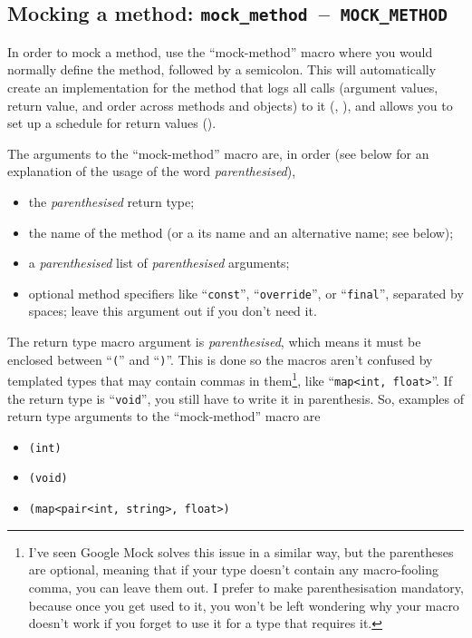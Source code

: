 \documentclass[twoside, a4paper, article]{memoir}
\newcommand*\testudocolor{\color{red!80!blue}}
\newcommand*\testudo[1]{\texttt{\testudocolor{}#1}}
\newcommand*\testudopair[2]{\testudo{#1}~--~\testudo{#2}}
\newcommand\subsectiontestudopair[3]{%
  \subsection[#1]{#1: \testudopair{#2}{#3}}}
\begin{document}
\subsectiontestudopair{Mocking a method}{mock\_method}{MOCK\_METHOD}
\label{sec:mocking-method}

In order to mock a method, use the ``mock-method'' macro where you would
normally define the method, followed by a semicolon.  This will automatically
create an implementation for the method that logs all calls (argument values,
return value, and order across methods and objects) to it
(, ), and
allows you to set up a schedule for return values
().

The arguments to the ``mock-method'' macro are, in order (see below for an
explanation of the usage of the word \emph{parenthesised}),
\begin{itemize}
\item the \emph{parenthesised} return type;
\item the name of the method (or a its name and an alternative name; see
  below);
\item a \emph{parenthesised} list of \emph{parenthesised} arguments;
\item optional method specifiers like ``\texttt{const}'',
  ``\texttt{override}'', or ``\texttt{final}'', separated by spaces; leave this
  argument out if you don't need it.
\end{itemize}

The return type macro argument is \emph{parenthesised}, which means it must be
enclosed between ``\texttt{(}'' and ``\texttt{)}''.  This is done so the macros
aren't confused by templated types that may contain commas in
them\footnote{I've seen Google Mock solves this issue in a similar way, but the
  parentheses are optional, meaning that if your type doesn't contain any
  macro-fooling comma, you can leave them out.  I prefer to make
  parenthesisation mandatory, because once you get used to it, you won't be
  left wondering why your macro doesn't work if you forget to use it for a type
  that requires it.}, like ``\texttt{map<int, float>}''.  If the return type is
``\texttt{void}'', you still have to write it in parenthesis.  So, examples of
return type arguments to the ``mock-method'' macro are
\begin{itemize}
\item \texttt{(int)}
\item \texttt{(void)}
\item \texttt{(map<pair<int, string>, float>)}
\end{itemize}
\end{document}
